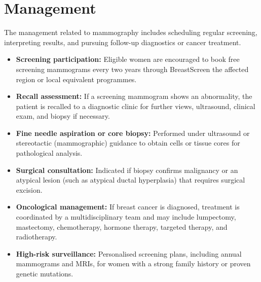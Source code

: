 \section*{Management}
The management related to mammography includes scheduling regular screening, interpreting results, and pursuing follow-up diagnostics or cancer treatment.
\begin{itemize}
    \item \textbf{Screening participation:} Eligible women are encouraged to book free screening mammograms every two years through BreastScreen the affected region or local equivalent programmes.
    \item \textbf{Recall assessment:} If a screening mammogram shows an abnormality, the patient is recalled to a diagnostic clinic for further views, ultrasound, clinical exam, and biopsy if necessary.
    \item \textbf{Fine needle aspiration or core biopsy:} Performed under ultrasound or stereotactic (mammographic) guidance to obtain cells or tissue cores for pathological analysis.
    \item \textbf{Surgical consultation:} Indicated if biopsy confirms malignancy or an atypical lesion (such as atypical ductal hyperplasia) that requires surgical excision.
    \item \textbf{Oncological management:} If breast cancer is diagnosed, treatment is coordinated by a multidisciplinary team and may include lumpectomy, mastectomy, chemotherapy, hormone therapy, targeted therapy, and radiotherapy.
    \item \textbf{High-risk surveillance:} Personalised screening plans, including annual mammograms and MRIs, for women with a strong family history or proven genetic mutations.
\end{itemize}

